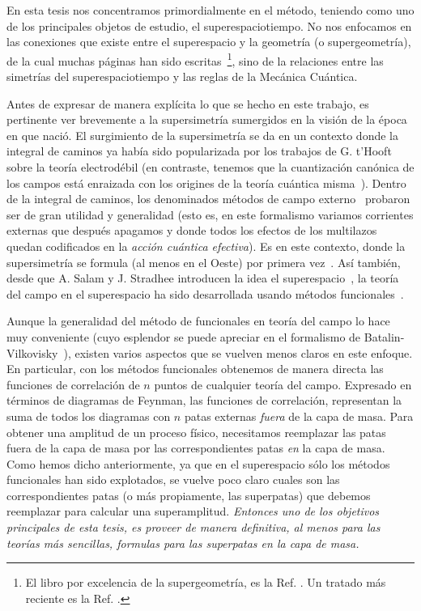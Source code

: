 En esta tesis nos concentramos primordialmente en el método, teniendo como uno de los principales objetos de estudio,  el superespaciotiempo. No nos enfocamos en  las conexiones que existe entre el superespacio y la geometría (o supergeometría), de la cual muchas páginas han sido escritas~\footnote{El libro por excelencia de la supergeometría, es la Ref. \cite{dewitt1992supermanifolds}. Un tratado más reciente es la Ref. \cite{rogers2007supermanifolds}.}, sino de la relaciones entre las simetrías del superespaciotiempo y las reglas de la Mecánica Cuántica. 

Antes de expresar de manera explícita lo que se hecho en este trabajo, es pertinente  ver brevemente a la supersimetría  sumergidos en la  visión de la época en que nació.   El surgimiento de la supersimetría se da en un contexto donde la integral de caminos ya había sido popularizada por los trabajos de G. t'Hooft~\cite{'tHooft:1971rn} sobre la teoría electrodébil (en  contraste, tenemos que   la  cuantización canónica de los campos  está enraizada con los origines de la teoría cuántica misma~\cite{dirac2001lectures}).  Dentro de la integral de caminos, los denominados métodos de campo externo~\cite{weinberg1996quantum} probaron ser de gran utilidad  y generalidad (esto es, en este formalismo variamos corrientes externas que después apagamos y donde todos los efectos de los multilazos quedan codificados en la \emph{acción cuántica efectiva}). Es en este contexto, donde la supersimetría se formula (al menos en el Oeste) por primera vez~\cite{Wess:1973kz}. Así también,  desde que A. Salam y J. Stradhee introducen la idea el superespacio~\cite{Salam:1974jj}, la teoría del campo en el superespacio ha sido desarrollada usando  métodos funcionales~\cite{Salam:1974pp,Salam:1974yz,Grisaru:1976vm,Grisaru:1979wc}.  
 
  Aunque la generalidad del método de funcionales en teoría del campo lo hace muy conveniente (cuyo esplendor se puede apreciar en el formalismo de Batalin-Vilkovisky~\cite{Batalin:1981jr}), existen varios aspectos que se vuelven menos claros en este enfoque. En particular, con  los métodos funcionales obtenemos de manera directa las funciones de correlación de  $ n $ puntos de cualquier teoría del campo. Expresado en términos  de diagramas de Feynman, las funciones de correlación, representan la  suma de todos los diagramas con $ n $   patas externas \textit{fuera} de la capa de masa. Para obtener una amplitud de un proceso físico, necesitamos reemplazar las patas fuera de la capa de masa por las correspondientes patas \textit{en} la capa de masa. Como hemos dicho anteriormente, ya que en el superespacio sólo los métodos funcionales han sido explotados, se vuelve poco claro cuales son las correspondientes patas (o más propiamente, las superpatas)  que debemos reemplazar para calcular una superamplitud. \textit{Entonces uno de los objetivos principales de esta tesis, es proveer de manera definitiva, al menos para las teorías más sencillas, formulas para las superpatas en la capa de masa.}

